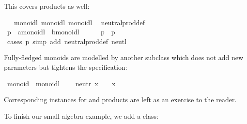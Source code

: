 \begin{isabellebody}
\begin{isamarkuptext}
This covers products as well:%
\end{isamarkuptext}%
\isamarkuptrue%
\isamarkupfalse%
\ {\isacharasterisk}\ {\isacharcolon}{\isacharcolon}\ {\isacharparenleft}monoidl{\isacharcomma}\ monoidl{\isacharparenright}\ monoidl\isanewline
{}\isanewline
\isanewline
{}\isamarkupfalse%
\isanewline
\ \ neutral{\isacharunderscore}prod{\isacharunderscore}def{\isacharcolon}\ {\isachardoublequoteopen}{\isasymzero}\ {\isacharequal}\ {\isacharparenleft}{\isasymzero}{\isacharcomma}\ {\isasymzero}{\isacharparenright}{\isachardoublequoteclose}\isanewline
\isanewline
{}\isamarkupfalse%
%
\isadelimproof
\ %
\endisadelimproof
%
\isatagproof
{}\isamarkupfalse%
\isanewline
\ \ \isamarkupfalse%
\ p\ {\isacharcolon}{\isacharcolon}\ {\isachardoublequoteopen}{\isacharprime}a{\isasymColon}monoidl\ {\isasymtimes}\ {\isacharprime}b{\isasymColon}monoidl{\isachardoublequoteclose}\isanewline
\ \ \isamarkupfalse%
\ {\isachardoublequoteopen}{\isasymzero}\ {\isasymoplus}\ p\ {\isacharequal}\ p{\isachardoublequoteclose}\isanewline
\ \ \ \ \isamarkupfalse%
\ {\isacharparenleft}cases\ p{\isacharparenright}\ {\isacharparenleft}simp\ add{\isacharcolon}\ neutral{\isacharunderscore}prod{\isacharunderscore}def\ neutl{\isacharparenright}\isanewline
{}\isamarkupfalse%
%
\endisatagproof
{\isafoldproof}%
%
\isadelimproof
%
\endisadelimproof
\isanewline
\isanewline
{}\isamarkupfalse%
%
\begin{isamarkuptext}%
\noindent Fully-fledged monoids are modelled by another
subclass which does not add new parameters but tightens the
specification:%
\end{isamarkuptext}%
\isamarkuptrue%
\isamarkupfalse%
\ monoid\ {\isacharequal}\ monoidl\ {\isacharplus}\isanewline
\ \ \ neutr{\isacharcolon}\ {\isachardoublequoteopen}x\ {\isasymoplus}\ {\isasymzero}\ {\isacharequal}\ x{\isachardoublequoteclose}%
\begin{isamarkuptext}%
\noindent Corresponding instances for  and products
are left as an exercise to the reader.%
\end{isamarkuptext}%
\isamarkuptrue%
%
\isamarkuptrue%
%
\begin{isamarkuptext}%
\noindent To finish our small algebra example, we add a  class:%
\end{isamarkuptext}%
\isamarkuptrue%

\end{isabellebody}

